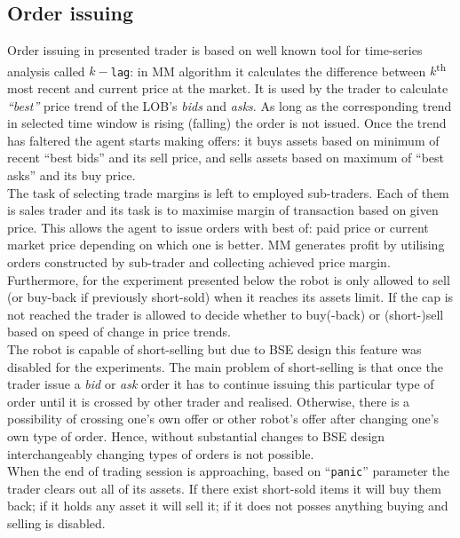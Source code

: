 \documentclass{llncs}
\begin{document}
\subsection{Order issuing}
Order issuing in presented trader is based on well known tool for time-series analysis called $k-$\texttt{lag}: in MM algorithm it calculates the difference between $k$\textsuperscript{th} most recent and current price at the market. It is used by the trader to calculate \emph{``best''} price trend of the LOB's \emph{bids} and \emph{asks}. As long as the corresponding trend in selected time window is rising (falling) the order is not issued. Once the trend has faltered the agent starts making offers: it buys assets based on minimum of recent ``best bids'' and its sell price, and sells assets based on maximum of ``best asks'' and its buy price.\\

The task of selecting trade margins is left to employed sub-traders. Each of them is sales trader and its task is to maximise margin of transaction based on given price. This allows the agent to issue orders with best of: paid price or current market price depending on which one is better. MM generates profit by utilising orders constructed by sub-trader and collecting achieved price margin.\\
Furthermore, for the experiment presented below the robot is only allowed to sell (or buy-back if previously short-sold) when it reaches its assets limit. If the cap is not reached the trader is allowed to decide whether to buy(-back) or (short-)sell based on speed of change in price trends.\\

The robot is capable of short-selling but due to BSE design this feature was disabled for the experiments. The main problem of short-selling is that once the trader issue a \emph{bid} or \emph{ask} order it has to continue issuing this particular type of order until it is crossed by other trader and realised. Otherwise, there is a possibility of crossing one's own offer or other robot's offer after changing one's own type of order. Hence, without substantial changes to BSE design interchangeably changing types of orders is not possible.\\

When the end of trading session is approaching, based on ``\texttt{panic}'' parameter the trader clears out all of its assets. If there exist short-sold items it will buy them back; if it holds any asset it will sell it; if it does not posses anything buying and selling is disabled.
\end{document}
